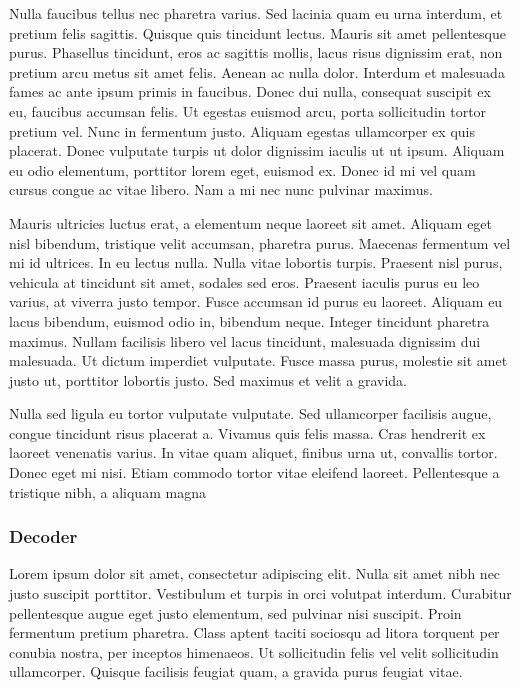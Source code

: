 Nulla faucibus tellus nec pharetra varius. Sed lacinia quam eu urna interdum, et pretium felis sagittis. Quisque quis tincidunt lectus. Mauris sit amet pellentesque purus. Phasellus tincidunt, eros ac sagittis mollis, lacus risus dignissim erat, non pretium arcu metus sit amet felis. Aenean ac nulla dolor. Interdum et malesuada fames ac ante ipsum primis in faucibus. Donec dui nulla, consequat suscipit ex eu, faucibus accumsan felis. Ut egestas euismod arcu, porta sollicitudin tortor pretium vel. Nunc in fermentum justo. Aliquam egestas ullamcorper ex quis placerat. Donec vulputate turpis ut dolor dignissim iaculis ut ut ipsum. Aliquam eu odio elementum, porttitor lorem eget, euismod ex. Donec id mi vel quam cursus congue ac vitae libero. Nam a mi nec nunc pulvinar maximus.

Mauris ultricies luctus erat, a elementum neque laoreet sit amet. Aliquam eget nisl bibendum, tristique velit accumsan, pharetra purus. Maecenas fermentum vel mi id ultrices. In eu lectus nulla. Nulla vitae lobortis turpis. Praesent nisl purus, vehicula at tincidunt sit amet, sodales sed eros. Praesent iaculis purus eu leo varius, at viverra justo tempor. Fusce accumsan id purus eu laoreet. Aliquam eu lacus bibendum, euismod odio in, bibendum neque. Integer tincidunt pharetra maximus. Nullam facilisis libero vel lacus tincidunt, malesuada dignissim dui malesuada. Ut dictum imperdiet vulputate. Fusce massa purus, molestie sit amet justo ut, porttitor lobortis justo. Sed maximus et velit a gravida.

Nulla sed ligula eu tortor vulputate vulputate. Sed ullamcorper facilisis augue, congue tincidunt risus placerat a. Vivamus quis felis massa. Cras hendrerit ex laoreet venenatis varius. In vitae quam aliquet, finibus urna ut, convallis tortor. Donec eget mi nisi. Etiam commodo tortor vitae eleifend laoreet. Pellentesque a tristique nibh, a aliquam magna
\subsubsection{Decoder}
Lorem ipsum dolor sit amet, consectetur adipiscing elit. Nulla sit amet nibh nec justo suscipit porttitor. Vestibulum et turpis in orci volutpat interdum. Curabitur pellentesque augue eget justo elementum, sed pulvinar nisi suscipit. Proin fermentum pretium pharetra. Class aptent taciti sociosqu ad litora torquent per conubia nostra, per inceptos himenaeos. Ut sollicitudin felis vel velit sollicitudin ullamcorper. Quisque facilisis feugiat quam, a gravida purus feugiat vitae.

